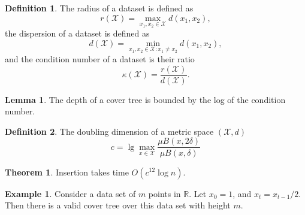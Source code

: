 \documentclass{article}
\theoremstyle{definition}
\newtheorem{defn}{Definition}
\newtheorem{theorem}{Theorem}
\newtheorem{lemma}{Lemma}
\newtheorem{example}{Example}
\newcommand{\set}{\mathcal}
\newcommand{\radius}{r}
\newcommand{\dispersion}{d}
\newcommand{\distf}{d}
\newcommand{\dist}[2]{\distf({#1},{#2})}
\begin{document}
\begin{defn}
The radius of a dataset is defined as
\begin{equation}
\radius(\set X) = {\displaystyle\max_{x_1,x_2\in \set X} \dist{x_1}{x_2}}
,
\end{equation}
the dispersion of a dataset is defined as
\begin{equation}
\dispersion(\set X) = {\displaystyle\min_{x_1,x_2\in \set X : x_1\neq x_2} \dist{x_1}{x_2}}
,
\end{equation}
and the condition number of a dataset is their ratio
\begin{equation}
\kappa(\set X)
= \frac
    {\radius(\set X)}
    {\dispersion(\set X)}
    .
\end{equation}
\end{defn}
\begin{lemma}
The depth of a cover tree is bounded by the log of the condition number.
\end{lemma}

\begin{defn}
The doubling dimension of a metric space $(\set X,\distf)$
\begin{equation}
c = \lg \max_{x\in\set X} \frac{\mu B(x,2\delta)}{\mu B(x,\delta)}
\end{equation}
\end{defn}

\begin{theorem}
Insertion takes time $O(c^{12} \log n)$.
\end{theorem}

\begin{example}
Consider a data set of $m$ points in $\mathbb{R}$.
Let $x_0=1$, and $x_t = x_{t-1}/2$.
Then there is a valid cover tree over this data set with height $m$.
\end{example}
\end{document}
